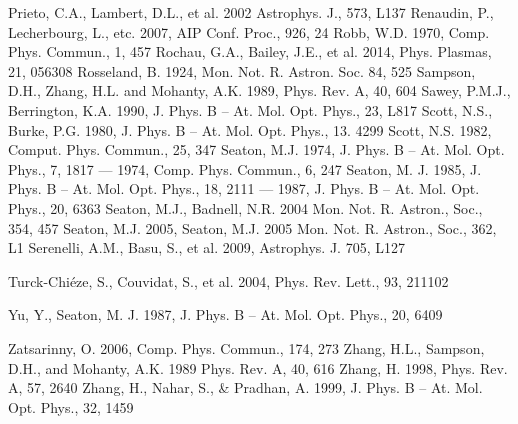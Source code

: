 \documentclass[11pt, double, phd]{osudiss-2}
\begin{document}
\begin {thebibliography} {}
 Prieto, C.A., Lambert, D.L., et al. 2002 Astrophys. J., 573, L137
 Renaudin, P., Lecherbourg, L., etc. 2007, AIP Conf. Proc., 926, 24
 Robb, W.D. 1970, Comp. Phys. Commun., 1, 457
 Rochau, G.A., Bailey, J.E., et al. 2014, Phys. Plasmas, 21, 056308
 Rosseland, B. 1924, Mon. Not. R. Astron. Soc.  84, 525
 Sampson, D.H., Zhang, H.L. and Mohanty, A.K. 1989, Phys. Rev. A, 40, 604
 Sawey, P.M.J., Berrington, K.A. 1990, J. Phys. B -- At. Mol. Opt. Phys., 23, L817
 Scott, N.S., Burke, P.G. 1980, J. Phys. B -- At. Mol. Opt. Phys., 13. 4299
 Scott, N.S. 1982, Comput. Phys. Commun., 25, 347
 Seaton, M.J. 1974, J. Phys. B -- At. Mol. Opt. Phys., 7, 1817
 --- 1974, Comp. Phys. Commun., 6, 247
 Seaton, M. J. 1985, J. Phys. B -- At. Mol. Opt. Phys., 18, 2111
 --- 1987, J. Phys. B -- At. Mol. Opt. Phys., 20, 6363
 Seaton, M.J., Badnell, N.R. 2004 Mon. Not. R. Astron., Soc., 354, 457
 Seaton, M.J. 2005, Seaton, M.J. 2005 Mon. Not. R. Astron., Soc., 362, L1
 Serenelli, A.M., Basu, S., et al. 2009, Astrophys. J. 705, L127

 Turck-Chi\'eze, S., Couvidat, S., et al. 2004, Phys. Rev. Lett., 93, 211102


 Yu, Y., Seaton, M. J. 1987, J. Phys. B -- At. Mol. Opt. Phys., 20, 6409

 Zatsarinny, O. 2006, Comp. Phys. Commun., 174, 273
 Zhang, H.L., Sampson, D.H., and Mohanty, A.K. 1989 Phys. Rev. A, 40, 616
 Zhang, H. 1998, Phys. Rev. A, 57, 2640
 Zhang, H., Nahar, S., \& Pradhan, A. 1999, J. Phys. B -- At. Mol. Opt. Phys., 32, 1459

\end{thebibliography}
\end{document}
